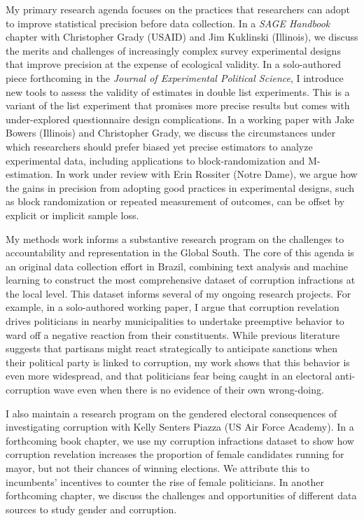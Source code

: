 \documentclass[
  11pt,
]{article}
\begin{document}
My primary research agenda focuses on the practices that researchers can
adopt to improve statistical precision before data collection. In a
\emph{SAGE Handbook} chapter with Christopher Grady (USAID) and Jim
Kuklinski (Illinois), we discuss the merits and challenges of
increasingly complex survey experimental designs that improve precision
at the expense of ecological validity. In a solo-authored piece
forthcoming in the \emph{Journal of Experimental Political Science}, I
introduce new tools to assess the validity of estimates in double list
experiments. This is a variant of the list experiment that promises more
precise results but comes with under-explored questionnaire design
complications. In a working paper with Jake Bowers (Illinois) and
Christopher Grady, we discuss the circumstances under which researchers
should prefer biased yet precise estimators to analyze experimental
data, including applications to block-randomization and M-estimation. In
work under review with Erin Rossiter (Notre Dame), we argue how the
gains in precision from adopting good practices in experimental designs,
such as block randomization or repeated measurement of outcomes, can be
offset by explicit or implicit sample loss.

My methods work informs a substantive research program on the challenges
to accountability and representation in the Global South. The core of
this agenda is an original data collection effort in Brazil, combining
text analysis and machine learning to construct the most comprehensive
dataset of corruption infractions at the local level. This dataset
informs several of my ongoing research projects. For example, in a
solo-authored working paper, I argue that corruption revelation drives
politicians in nearby municipalities to undertake preemptive behavior to
ward off a negative reaction from their constituents. While previous
literature suggests that partisans might react strategically to
anticipate sanctions when their political party is linked to corruption,
my work shows that this behavior is even more widespread, and that
politicians fear being caught in an electoral anti-corruption wave even
when there is no evidence of their own wrong-doing.

I also maintain a research program on the gendered electoral
consequences of investigating corruption with Kelly Senters Piazza (US
Air Force Academy). In a forthcoming book chapter, we use my corruption
infractions dataset to show how corruption revelation increases the
proportion of female candidates running for mayor, but not their chances
of winning elections. We attribute this to incumbents' incentives to
counter the rise of female politicians. In another forthcoming chapter,
we discuss the challenges and opportunities of different data sources to
study gender and corruption.
\end{document}
